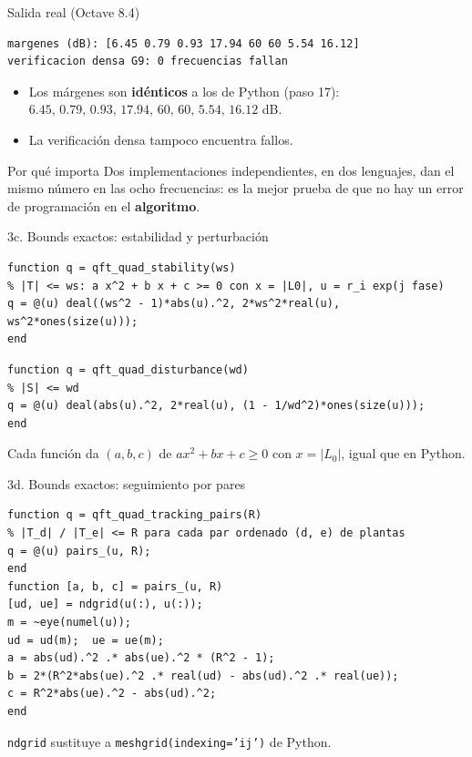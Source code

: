 \documentclass[aspectratio=169,11pt]{beamer}
\begin{document}
\begin{frame}[fragile]{Salida real (Octave 8.4)}
  \footnotesize
  \begin{verbatim}
margenes (dB): [6.45 0.79 0.93 17.94 60 60 5.54 16.12]
verificacion densa G9: 0 frecuencias fallan
  \end{verbatim}
  \begin{itemize}
    \item Los márgenes son \textbf{idénticos} a los de Python (paso 17): $6.45,\,0.79,\,0.93,\,17.94,\,60,\,60,\,5.54,\,16.12$ dB.
    \item La verificación densa tampoco encuentra fallos.
  \end{itemize}
  \begin{alertblock}{Por qué importa}
    Dos implementaciones independientes, en dos lenguajes, dan el mismo número en las ocho frecuencias: es la mejor prueba de que no hay un error de programación en el \textbf{algoritmo}.
  \end{alertblock}
\end{frame}

\begin{frame}[fragile]{3c. Bounds exactos: estabilidad y perturbación}
\scriptsize
\begin{verbatim}
function q = qft_quad_stability(ws)
% |T| <= ws: a x^2 + b x + c >= 0 con x = |L0|, u = r_i exp(j fase)
q = @(u) deal((ws^2 - 1)*abs(u).^2, 2*ws^2*real(u), ws^2*ones(size(u)));
end
\end{verbatim}
\scriptsize
\begin{verbatim}
function q = qft_quad_disturbance(wd)
% |S| <= wd
q = @(u) deal(abs(u).^2, 2*real(u), (1 - 1/wd^2)*ones(size(u)));
end
\end{verbatim}
\footnotesize Cada función da $(a,b,c)$ de $a x^2+bx+c\ge0$ con $x=|L_0|$, igual que en Python.
\end{frame}

\begin{frame}[fragile]{3d. Bounds exactos: seguimiento por pares}
\scriptsize
\begin{verbatim}
function q = qft_quad_tracking_pairs(R)
% |T_d| / |T_e| <= R para cada par ordenado (d, e) de plantas
q = @(u) pairs_(u, R);
end
function [a, b, c] = pairs_(u, R)
[ud, ue] = ndgrid(u(:), u(:));
m = ~eye(numel(u));
ud = ud(m);  ue = ue(m);
a = abs(ud).^2 .* abs(ue).^2 * (R^2 - 1);
b = 2*(R^2*abs(ue).^2 .* real(ud) - abs(ud).^2 .* real(ue));
c = R^2*abs(ue).^2 - abs(ud).^2;
end
\end{verbatim}
\footnotesize \texttt{ndgrid} sustituye a \texttt{meshgrid(indexing='ij')} de Python.
\end{frame}
\end{document}
